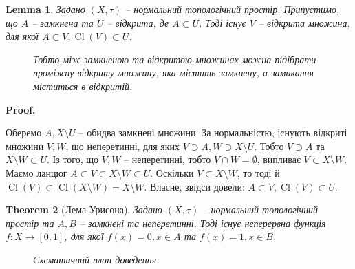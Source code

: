 \documentclass[a4paper, 10pt]{article}
\makeatletter
\theoremstyle{theoremdd}
\newtheorem{theorem}{Theorem}[subsection]
\newtheorem{lemma}[theorem]{Lemma}
\DeclareMathOperator{\Cl}{Cl}
\renewenvironment{proof}[1][Proof.\\]{\par
\pushQED{\hfill \qed}%
\normalfont \topsep6\p@\@plus6\p@\relax
\trivlist
\item\relax
{\bfseries
#1\@addpunct{.}}\hspace\labelsep\ignorespaces
}{%
\popQED\endtrivlist\@endpefalse
}
\makeatother
\begin{document}
\begin{lemma}
Задано $(X,\tau)$ -- нормальний топологічний простір. Припустимо, що $A$ -- замкнена та $U$ -- відкрита, де $A \subset U$. Тоді існує $V$ -- відкрита множина, для якої $A \subset V, \Cl(V) \subset U$.
\begin{figure}[H]
\centering
{}
\caption*{Тобто між замкненою та відкритою множинах можна підібрати проміжну відкриту множину, яка містить замкнену, а замикання міститься в відкритій.}
\end{figure}
\end{lemma}
\newpage
\begin{proof}
Оберемо $A, X \setminus U$ -- обидва замкнені множини. За нормальністю, існують відкриті множини $V,W$, що неперетинні, для яких $V \supset A, W \supset X \setminus U$. Тобто $V \supset A$ та $X \setminus W \subset U$. Із того, що $V,W$ -- неперетинні, тобто $V \cap W = \emptyset$, випливає $V \subset X \setminus W$. Маємо ланцюг $A \subset V \subset X \setminus W \subset U$. Оскільки $V \subset X \setminus W$, то тоді й $\Cl(V) \subset \Cl(X \setminus W) = X \setminus W$. Власне, звідси довели: $A \subset V, \Cl(V) \subset U$.
\end{proof}

\begin{theorem}[Лема Урисона]
Задано $(X,\tau)$ -- нормальний топологічний простір та $A,B$ -- замкнені та неперетинні. Тоді існує неперервна функція $f \colon X \to [0,1]$, для якої $f(x) = 0, x \in A$ та $f(x) = 1, x \in B$.
\begin{figure}[H]
\centering
{}
\caption*{Схематичний план доведення.}
\end{figure}
\end{theorem}
\end{document}
